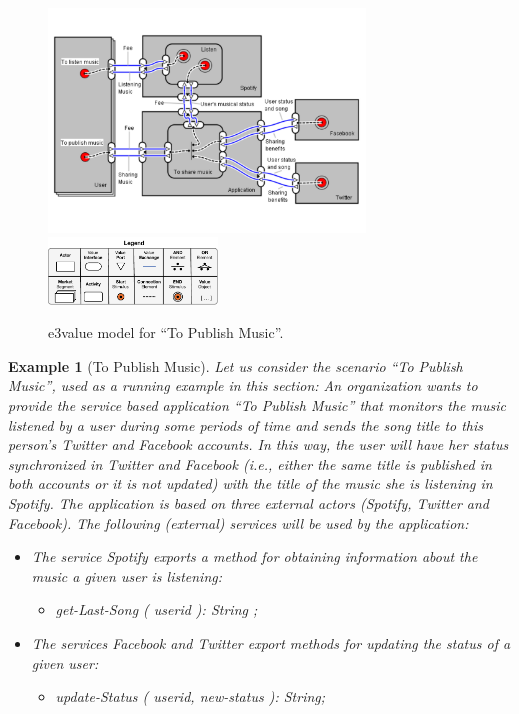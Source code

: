 \documentclass[12pt,twoside]{article}
\theoremstyle{plain}
\theoremstyle{plain}
\newtheorem{example}{Example}
\begin{document}
\begin{multicols}{2}
\begin{figure}
\center
\includegraphics[width=0.75\textwidth]{e3value.pdf}
\hspace*{5cm}\includegraphics[width=0.4\textwidth]{3ValueKey.pdf}
\caption{\label{fig:CIM:tpme3v} e3value model for ``To Publish Music''.}
\end{figure}

\begin{example}[To Publish Music]\label{ex:toPublicMusic}
Let us consider the scenario ``To Publish Music'', used as a running example in this section:
An organization wants to provide the service based application ``To Publish Music'' that monitors the music listened by a user during some periods of time and sends the song title  to this person's Twitter and Facebook accounts.
In this way, the user will have her status synchronized in  Twitter and Facebook (i.e., either the same title is published in both accounts or it is not updated) with the title of the music she is listening in Spotify.
The application is based on three external actors ({\em Spotify, Twitter} and {\em Facebook}).
The following (external) services will be used by the application:
\begin{itemize}
\item The  service   Spotify exports a meth\-od for obtaining information  about the music a given user is listening:
\begin{itemize} \item {\sf\small get-Last-Song ( userid ): String} ; \end{itemize}
\item The services Facebook and Twitter export meth\-ods for  updating the status of a given user:
\begin{itemize}
\item {\sf\small update-Status ( userid, new-status ): String};
\end{itemize}
\end{itemize}





\end{example}
\end{multicols}
\end{document}
